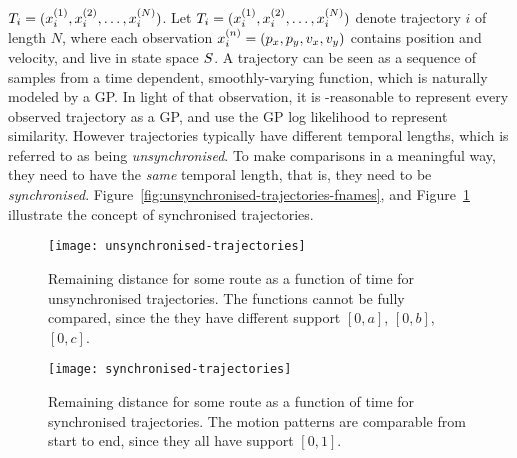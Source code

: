 $T_{i} = (x_{i}^{(1)},
x_{i}^{(2)}, \ldots, x_{i}^{(N)})$. 
Let $T_{i} = (x_{i}^{(1)}, x_{i}^{(2)}, \ldots, x_{i}^{(N)})$ denote trajectory
$i$ of length $N$, where each observation $x_{i}^{(n)} = (p_x, p_y,
v_x, v_y)$ contains position and velocity, and live in state space $S$. 
A trajectory can be seen as a sequence of
samples from a time dependent, smoothly-varying function, which is naturally
modeled by a GP. In light of that observation, it is -reasonable to represent every observed trajectory as
a GP, and use the GP log likelihood to represent similarity. However
trajectories typically have different temporal lengths, which is
referred to as being \textit{unsynchronised}. To make comparisons in a
meaningful way, they need to have the \textit{same} temporal length,
that is, they need to be \textit{synchronised}. 
Figure~\ref{fig:unsynchronised-trajectories-fnames}, and
Figure~\ref{fig:synchronised-trajectories-fnames} illustrate the
concept of synchronised trajectories.
\begin{figure}
\begin{minipage}{.5\textwidth}
    \texttt{[image: unsynchronised-trajectories]}
    \caption{Remaining distance for some route as a function of time for 
      unsynchronised trajectories. The functions cannot be
      fully compared, since the they have different support $[0, a]$,
      $[0, b]$, $[0, c]$.}\label{fig:unsynchronised-trajectories-fnames}
\end{minipage}
\hspace{5pt}
\begin{minipage}{.48\textwidth}
\texttt{[image: synchronised-trajectories]}
    \caption{Remaining distance for some route as a function of time for 
      synchronised trajectories. The motion patterns are comparable from
      start to end, since they all have support $[0, 1]$.}\label{fig:synchronised-trajectories-fnames}
\end{minipage}
\end{figure}

